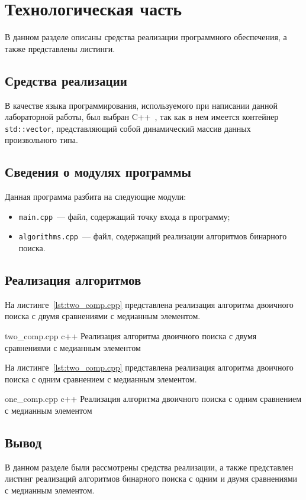 \chapter{Технологическая часть}

В данном разделе описаны средства реализации программного обеспечения, а также представлены листинги.

\section{Средства реализации}

В качестве языка программирования, используемого при написании данной лабораторной работы, был выбран C++~\cite{cpp-lang}, так как в нем имеется контейнер \texttt{std::vector}, представляющий собой динамический массив данных произвольного типа.

\section{Сведения о модулях программы}

Данная программа разбита на следующие модули:

\begin{itemize}
	\item \texttt{main.cpp}~--- файл, содержащий точку входа в программу;
	\item \texttt{algorithms.cpp}~--- файл, содержащий реализации алгоритмов бинарного поиска.
\end{itemize}

\section{Реализация алгоритмов}

На листинге~\ref{lst:two_comp.cpp} представлена реализация алгоритма двоичного поиска с двумя сравнениями с медианным элементом.

	{two_comp.cpp}
	{c++}
	{Реализация алгоритма двоичного поиска с двумя сравнениями с медианным элементом}

На листинге~\ref{lst:two_comp.cpp} представлена реализация алгоритма двоичного поиска с одним сравнением с медианным элементом.

	{one_comp.cpp}
	{c++}
	{Реализация алгоритма двоичного поиска с одним сравнением с медианным элементом}

	
\section*{Вывод}

В данном разделе были рассмотрены средства реализации, а также представлен листинг реализаций алгоритмов бинарного поиска с одним и двумя сравнениями с медианным элементом.